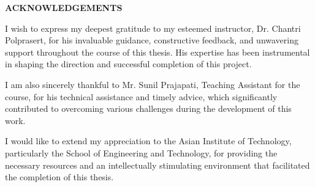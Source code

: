   \begin{center}
  \large{\bf ACKNOWLEDGEMENTS}
  \end{center}

I wish to express my deepest gratitude to my esteemed instructor, Dr. Chantri Polprasert, for his invaluable guidance, constructive feedback, and unwavering support throughout the course of this thesis. His expertise has been instrumental in shaping the direction and successful completion of this project.

I am also sincerely thankful to Mr. Sunil Prajapati, Teaching Assistant for the course, for his technical assistance and timely advice, which significantly contributed to overcoming various challenges during the development of this work.

I would like to extend my appreciation to the Asian Institute of Technology, particularly the School of Engineering and Technology, for providing the necessary resources and an intellectually stimulating environment that facilitated the completion of this thesis.
